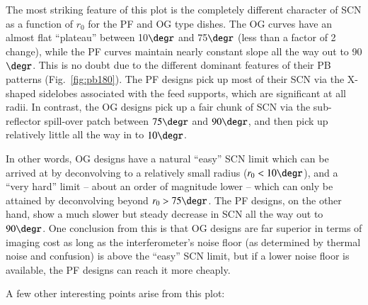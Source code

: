 \documentclass{aa}
\begin{document}
The most striking feature of this plot is the completely different character of SCN as a function of $r_0$ for the PF and OG type dishes. The OG curves have an almost flat ``plateau'' between 10$\degr$ and 75$\degr$ (less than a factor of 2 change), while the PF curves maintain nearly constant slope all the way out to 90$\degr$. This is no doubt due to the different dominant features of their PB patterns (Fig.~\ref{fig:pb180}). The PF designs pick up most of their SCN via the X-shaped sidelobes associated with the feed supports, which are significant at all radii. In contrast, the OG designs pick up a fair chunk of SCN via the sub-reflector spill-over patch between $75\degr$ and $90\degr$, and then pick up relatively little all the way in to $10\degr$. 

In other words, OG designs have a natural ``easy'' SCN limit which can be arrived at by deconvolving to a relatively small radius ($r_0<10\degr$), and a ``very hard'' limit -- about an order of magnitude lower -- which can only be attained by deconvolving beyond $r_0>75\degr$. The PF designs, on the other hand, show a much slower but steady decrease in SCN all the way out to $90\degr$. One conclusion from this is that OG designs are far superior in terms of imaging cost as long as the  interferometer's noise floor (as determined by thermal noise and confusion) is above the ``easy'' SCN limit, but if a lower noise floor is available, the PF designs can reach it more cheaply.

A few other interesting points arise from this plot:
\end{document}
